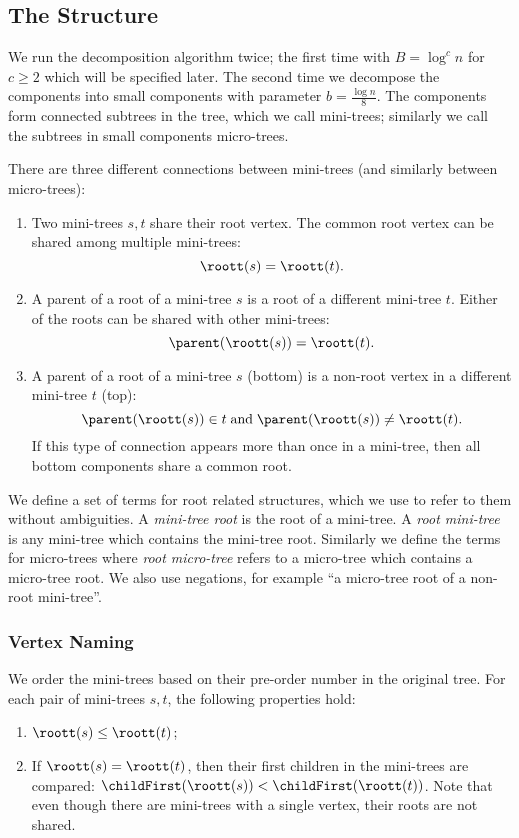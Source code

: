 \subsection{The Structure}

We run the decomposition algorithm twice; the first time with $B = \log^c n$ for $c \ge 2$ which will be specified later.
The second time we decompose the components into small components with parameter $b = \frac{\log n}{8}$.
The components form connected subtrees in the tree, which we call mini-trees; similarly we call the subtrees in small components micro-trees.

There are three different connections between mini-trees (and similarly between micro-trees):
\begin{enumerate}
	\item Two mini-trees $s, t$ share their root vertex.
	The common root vertex can be shared among multiple mini-trees:
	$$\roott(s) = \roott(t).$$

	\item A parent of a root of a mini-tree $s$ is a root of a different mini-tree $t$.
	Either of the roots can be shared with other mini-trees:
	$$\parent(\roott(s)) = \roott(t).$$

	\item A parent of a root of a mini-tree $s$ (bottom) is a non-root vertex in a different mini-tree $t$ (top):
	$$\parent(\roott(s)) \in t \booland \parent(\roott(s)) \ne \roott(t).$$
	If this type of connection appears more than once in a mini-tree, then all bottom components share a common root.
\end{enumerate}

We define a set of terms for root related structures, which we use to refer to them without ambiguities.
A \emph{mini-tree root} is the root of a mini-tree.
A \emph{root mini-tree} is any mini-tree which contains the mini-tree root.
Similarly we define the terms for micro-trees where \emph{root micro-tree} refers to a micro-tree which contains a micro-tree root.
We also use negations, for example ``a micro-tree root of a non-root mini-tree''.

\subsubsection{Vertex Naming}

We order the mini-trees based on their pre-order number in the original tree.
For each pair of mini-trees $s, t$, the following properties hold:
\begin{enumerate}
	\item $\roott(s) \le \roott(t)$;
	\item If $\roott(s) = \roott(t)$, then their first children in the mini-trees are compared: $ \childFirst(\roott(s)) < \childFirst(\roott(t))$.
	Note that even though there are mini-trees with a single vertex, their roots are not shared.
\end{enumerate}

